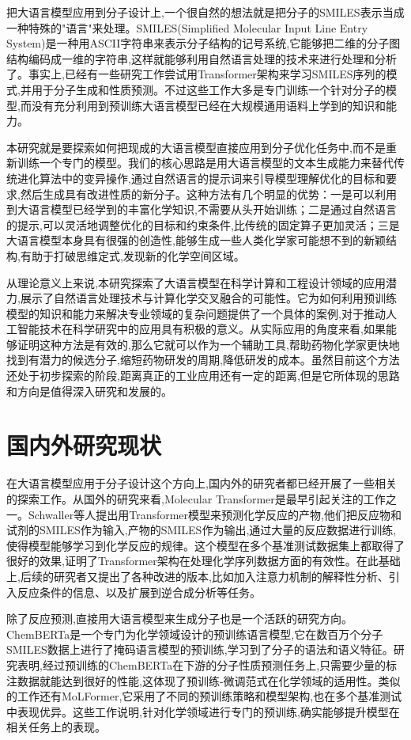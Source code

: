 把大语言模型应用到分子设计上,一个很自然的想法就是把分子的SMILES表示当成一种特殊的"语言"来处理。SMILES(Simplified Molecular Input Line Entry System)是一种用ASCII字符串来表示分子结构的记号系统,它能够把二维的分子图结构编码成一维的字符串,这样就能够利用自然语言处理的技术来进行处理和分析了\cite{weininger1988smiles}。事实上,已经有一些研究工作尝试用Transformer架构来学习SMILES序列的模式,并用于分子生成和性质预测\cite{schwaller2019molecular}。不过这些工作大多是专门训练一个针对分子的模型,而没有充分利用到预训练大语言模型已经在大规模通用语料上学到的知识和能力。

本研究就是要探索如何把现成的大语言模型直接应用到分子优化任务中,而不是重新训练一个专门的模型。我们的核心思路是用大语言模型的文本生成能力来替代传统进化算法中的变异操作,通过自然语言的提示词来引导模型理解优化的目标和要求,然后生成具有改进性质的新分子。这种方法有几个明显的优势：一是可以利用到大语言模型已经学到的丰富化学知识,不需要从头开始训练；二是通过自然语言的提示,可以灵活地调整优化的目标和约束条件,比传统的固定算子更加灵活；三是大语言模型本身具有很强的创造性,能够生成一些人类化学家可能想不到的新颖结构,有助于打破思维定式,发现新的化学空间区域。

从理论意义上来说,本研究探索了大语言模型在科学计算和工程设计领域的应用潜力,展示了自然语言处理技术与计算化学交叉融合的可能性。它为如何利用预训练模型的知识和能力来解决专业领域的复杂问题提供了一个具体的案例,对于推动人工智能技术在科学研究中的应用具有积极的意义。从实际应用的角度来看,如果能够证明这种方法是有效的,那么它就可以作为一个辅助工具,帮助药物化学家更快地找到有潜力的候选分子,缩短药物研发的周期,降低研发的成本。虽然目前这个方法还处于初步探索的阶段,距离真正的工业应用还有一定的距离,但是它所体现的思路和方向是值得深入研究和发展的。

\section{国内外研究现状}

在大语言模型应用于分子设计这个方向上,国内外的研究者都已经开展了一些相关的探索工作。从国外的研究来看,Molecular Transformer是最早引起关注的工作之一。Schwaller等人提出用Transformer模型来预测化学反应的产物,他们把反应物和试剂的SMILES作为输入,产物的SMILES作为输出,通过大量的反应数据进行训练,使得模型能够学习到化学反应的规律\cite{schwaller2019molecular}。这个模型在多个基准测试数据集上都取得了很好的效果,证明了Transformer架构在处理化学序列数据方面的有效性。在此基础上,后续的研究者又提出了各种改进的版本,比如加入注意力机制的解释性分析、引入反应条件的信息、以及扩展到逆合成分析等任务。

除了反应预测,直接用大语言模型来生成分子也是一个活跃的研究方向。ChemBERTa是一个专门为化学领域设计的预训练语言模型,它在数百万个分子SMILES数据上进行了掩码语言模型的预训练,学习到了分子的语法和语义特征\cite{chithrananda2020chemberta}。研究表明,经过预训练的ChemBERTa在下游的分子性质预测任务上,只需要少量的标注数据就能达到很好的性能,这体现了预训练-微调范式在化学领域的适用性。类似的工作还有MoLFormer,它采用了不同的预训练策略和模型架构,也在多个基准测试中表现优异\cite{ross2022molformer}。这些工作说明,针对化学领域进行专门的预训练,确实能够提升模型在相关任务上的表现。

